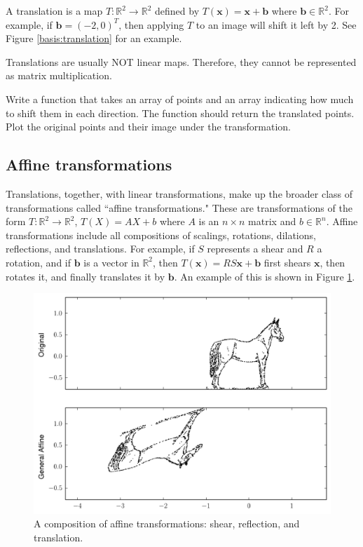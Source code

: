 A translation is a map $T: \mathbb{R}^2 \rightarrow \mathbb{R}^2$ defined by $T(\mathbf{x}) = \mathbf{x}+\mathbf{b}$ where $\mathbf{b} \in \mathbb{R}^2$. For example, if $\mathbf{b} = (-2, 0)^T$, then applying $T$ to an image will shift it left by 2. See Figure \ref{basis:translation} for an example.


Translations are usually NOT linear maps. Therefore, they cannot be represented as matrix multiplication.

\begin{problem}
Write a function that takes an array of points and an array indicating how much to shift them in each direction. The function should return the translated points.
Plot the original points and their image under the transformation.
\end{problem}

\subsection*{Affine transformations}
Translations, together, with linear transformations, make up the broader class of transformations called
``affine transformations." These are transformations of the form $T: \mathbb{R}^2 \to \mathbb{R}^2$, $T(X) = AX + b$ where $A$ is an $n\times n$ matrix and $b \in \mathbb{R}^n$. Affine transformations include all compositions of scalings, rotations, dilations, reflections, and translations. For example, if $S$ represents a shear and $R$ a rotation, and if $\mathbf{b}$ is a vector in $\mathbb{R}^2$, then $T(\mathbf{x}) = RS\mathbf{x} + \mathbf{b}$ first shears $\mathbf{x}$, then rotates it, and finally translates it by $\mathbf{b}$. An example of this is shown in Figure \ref{basis:combo}.


\begin{figure}
\centering
\includegraphics[width=\textwidth]{combo.pdf}
\caption{
A composition of affine transformations: shear, reflection, and translation.}
\label{basis:combo}
\end{figure}

